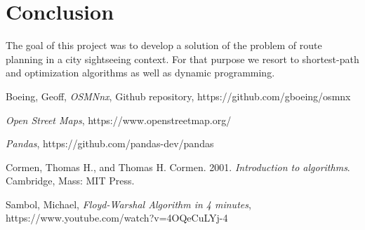 \documentclass{article}
\begin{document}
\section*{Conclusion} 

The goal of this project was to develop a solution of the problem of route planning in a city sightseeing context. For that purpose we resort to shortest-path and optimization algorithms as well as dynamic programming.

\begin{thebibliography}{9}

Boeing, Geoff, \textit{OSMNnx}, Github repository, https://github.com/gboeing/osmnx

\textit{Open Street Maps}, https://www.openstreetmap.org/

\textit{Pandas}, https://github.com/pandas-dev/pandas

Cormen, Thomas H., and Thomas H. Cormen. 2001. \textit{Introduction to algorithms}. Cambridge, Mass: MIT Press.

Sambol, Michael, \textit{Floyd-Warshal Algorithm in 4 minutes}, https://www.youtube.com/watch?v=4OQeCuLYj-4

\end{thebibliography}
\end{document}
